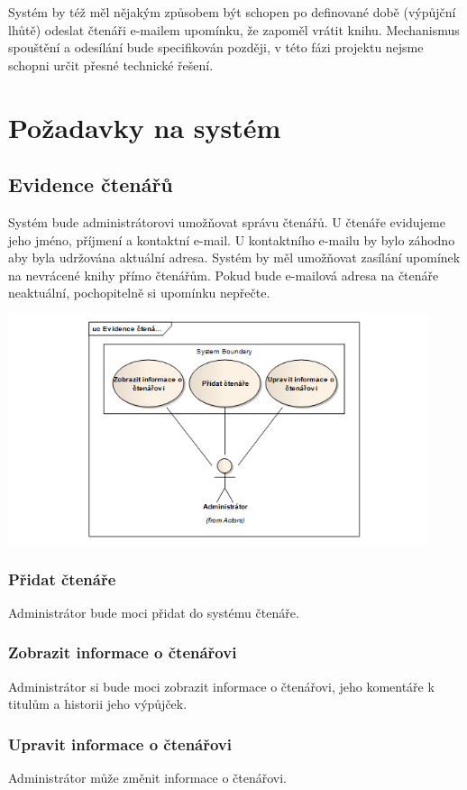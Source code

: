 \documentclass{article}
\begin{document}
Systém by též měl nějakým způsobem být schopen po definované době (výpůjční
lhůtě) odeslat čtenáři e-mailem upomínku, že zapoměl vrátit knihu. Mechanismus
spouštění a odesílání bude specifikován později, v této fázi projektu nejsme
schopni určit přesné technické řešení.

\newpage

\section{Požadavky na systém}
\subsection{Evidence čtenářů}

Systém bude administrátorovi umožňovat správu čtenářů. U čtenáře evidujeme jeho
jméno, příjmení a kontaktní e-mail.
U kontaktního e-mailu by bylo záhodno aby byla udržována aktuální adresa. Systém
by měl umožňovat zasílání upomínek na nevrácené knihy přímo čtenářům. Pokud bude
e-mailová adresa na čtenáře neaktuální, pochopitelně si upomínku nepřečte.

\includegraphics[width=350pt]{img/evidencectenaru.png}
\subsubsection{Přidat čtenáře}
Administrátor bude moci přidat do systému čtenáře.

\subsubsection{Zobrazit informace o čtenářovi}
Administrátor si bude moci zobrazit informace o čtenářovi, jeho komentáře k
titulům a historii jeho výpůjček.

\subsubsection{Upravit informace o čtenářovi}
Administrátor může změnit informace o čtenářovi.
\end{document}
